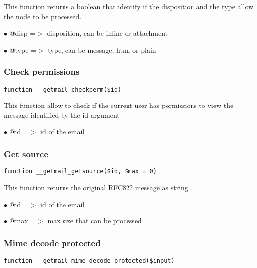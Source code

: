 \documentclass[a4paper]{article}
\begin{document}
This function returns a boolean that identify if the disposition and the type
allow the node to be processed.

\begin{compactitem}
\item[\color{myblue}$\bullet$] @disp =$>$ disposition, can be inline or attachment
\item[\color{myblue}$\bullet$] @type =$>$ type, can be message, html or plain
\end{compactitem}

\hypertarget{toc36}{}
\subsubsection{Check permissions}

\begin{lstlisting}
function __getmail_checkperm($id)
\end{lstlisting}

This function allow to check if the current user has permissions to view the
message identified by the id argument

\begin{compactitem}
\item[\color{myblue}$\bullet$] @id =$>$ id of the email
\end{compactitem}

\hypertarget{toc37}{}
\subsubsection{Get source}

\begin{lstlisting}
function __getmail_getsource($id, $max = 0)
\end{lstlisting}

This function returns the original RFC822 message as string

\begin{compactitem}
\item[\color{myblue}$\bullet$] @id  =$>$ id of the email
\item[\color{myblue}$\bullet$] @max =$>$ max size that can be processed
\end{compactitem}

\hypertarget{toc38}{}
\subsubsection{Mime decode protected}

\begin{lstlisting}
function __getmail_mime_decode_protected($input)
\end{lstlisting}
\end{document}
